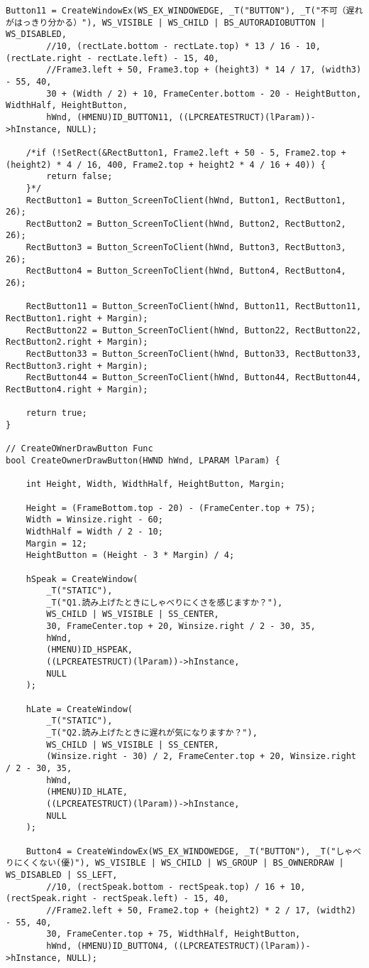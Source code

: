 \begin{lstlisting}[caption=window.cpp]
	Button11 = CreateWindowEx(WS_EX_WINDOWEDGE, _T("BUTTON"), _T("不可（遅れがはっきり分かる）"), WS_VISIBLE | WS_CHILD | BS_AUTORADIOBUTTON | WS_DISABLED,
		//10, (rectLate.bottom - rectLate.top) * 13 / 16 - 10, (rectLate.right - rectLate.left) - 15, 40,
		//Frame3.left + 50, Frame3.top + (height3) * 14 / 17, (width3) - 55, 40,
		30 + (Width / 2) + 10, FrameCenter.bottom - 20 - HeightButton, WidthHalf, HeightButton,
		hWnd, (HMENU)ID_BUTTON11, ((LPCREATESTRUCT)(lParam))->hInstance, NULL);

	/*if (!SetRect(&RectButton1, Frame2.left + 50 - 5, Frame2.top + (height2) * 4 / 16, 400, Frame2.top + height2 * 4 / 16 + 40)) {
		return false;
	}*/
	RectButton1 = Button_ScreenToClient(hWnd, Button1, RectButton1, 26);
	RectButton2 = Button_ScreenToClient(hWnd, Button2, RectButton2, 26);
	RectButton3 = Button_ScreenToClient(hWnd, Button3, RectButton3, 26);
	RectButton4 = Button_ScreenToClient(hWnd, Button4, RectButton4, 26);

    RectButton11 = Button_ScreenToClient(hWnd, Button11, RectButton11, RectButton1.right + Margin);
    RectButton22 = Button_ScreenToClient(hWnd, Button22, RectButton22, RectButton2.right + Margin);
    RectButton33 = Button_ScreenToClient(hWnd, Button33, RectButton33, RectButton3.right + Margin);
    RectButton44 = Button_ScreenToClient(hWnd, Button44, RectButton44, RectButton4.right + Margin);

	return true;
}

// CreateOWnerDrawButton Func
bool CreateOwnerDrawButton(HWND hWnd, LPARAM lParam) {

	int Height, Width, WidthHalf, HeightButton, Margin;

	Height = (FrameBottom.top - 20) - (FrameCenter.top + 75);
	Width = Winsize.right - 60;
	WidthHalf = Width / 2 - 10;
	Margin = 12;
	HeightButton = (Height - 3 * Margin) / 4;

	hSpeak = CreateWindow(
		_T("STATIC"),
		_T("Q1.読み上げたときにしゃべりにくさを感じますか？"),
		WS_CHILD | WS_VISIBLE | SS_CENTER,
		30, FrameCenter.top + 20, Winsize.right / 2 - 30, 35,
		hWnd,
		(HMENU)ID_HSPEAK,
		((LPCREATESTRUCT)(lParam))->hInstance,
		NULL
	);

	hLate = CreateWindow(
		_T("STATIC"),
		_T("Q2.読み上げたときに遅れが気になりますか？"),
		WS_CHILD | WS_VISIBLE | SS_CENTER,
		(Winsize.right - 30) / 2, FrameCenter.top + 20, Winsize.right / 2 - 30, 35,
		hWnd,
		(HMENU)ID_HLATE,
		((LPCREATESTRUCT)(lParam))->hInstance,
		NULL
	);

	Button4 = CreateWindowEx(WS_EX_WINDOWEDGE, _T("BUTTON"), _T("しゃべりにくくない(優)"), WS_VISIBLE | WS_CHILD | WS_GROUP | BS_OWNERDRAW | WS_DISABLED | SS_LEFT,
		//10, (rectSpeak.bottom - rectSpeak.top) / 16 + 10, (rectSpeak.right - rectSpeak.left) - 15, 40,
		//Frame2.left + 50, Frame2.top + (height2) * 2 / 17, (width2) - 55, 40,
		30, FrameCenter.top + 75, WidthHalf, HeightButton,
		hWnd, (HMENU)ID_BUTTON4, ((LPCREATESTRUCT)(lParam))->hInstance, NULL);


\end{lstlisting}
